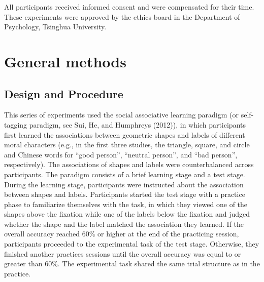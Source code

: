 \documentclass[
  man]{apa6}
\begin{document}
All participants received informed consent and were compensated for their time. These experiments were approved by the ethics board in the Department of Psychology, Tsinghua University.

\hypertarget{general-methods}{%
\section{General methods}\label{general-methods}}

\hypertarget{design-and-procedure}{%
\subsection{Design and Procedure}\label{design-and-procedure}}

This series of experiments used the social associative learning paradigm (or self-tagging paradigm, see Sui, He, and Humphreys (2012)), in which participants first learned the associations between geometric shapes and labels of different moral characters (e.g., in the first three studies, the triangle, square, and circle and Chinese words for ``good person'', ``neutral person'', and ``bad person'', respectively). The associations of shapes and labels were counterbalanced across participants. The paradigm consists of a brief learning stage and a test stage. During the learning stage, participants were instructed about the association between shapes and labels. Participants started the test stage with a practice phase to familiarize themselves with the task, in which they viewed one of the shapes above the fixation while one of the labels below the fixation and judged whether the shape and the label matched the association they learned. If the overall accuracy reached 60\% or higher at the end of the practicing session, participants proceeded to the experimental task of the test stage. Otherwise, they finished another practices sessions until the overall accuracy was equal to or greater than 60\%. The experimental task shared the same trial structure as in the practice.
\end{document}
